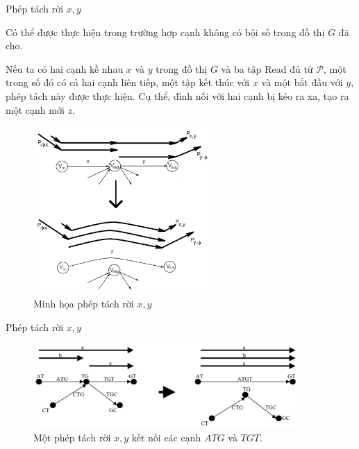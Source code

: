 \documentclass[10pt]{beamer}
\theoremstyle{remark}
\numberwithin{algocf}{section}
\numberwithin{equation}{section}
\numberwithin{dl}{section}
\numberwithin{figure}{section}
\begin{document}
\begin{frame}{Phép tách rời $x, y$}

    Có thể được thực hiện trong trường hợp cạnh không có bội số trong đồ thị $G$ đã cho.
    
    Nếu ta có hai cạnh kề nhau $x$ và $y$ trong đồ thị $G$ và ba tập Read đủ từ $\mathcal{P}$, một trong số đó có cả hai cạnh liên tiếp, một tập kết thúc với $x$ và một bắt đầu với $y$, phép tách này được thực hiện. Cụ thể, đỉnh nối với hai cạnh bị kéo ra xa, tạo ra một cạnh mới $z$.

    \begin{figure}[h!]
        \centering
        \includegraphics[width=0.6\textwidth]{figures/xy_detachment.png}
        \caption{Minh họa phép tách rời $x, y$ \cite{pevzner2001new}}
    \end{figure}
\end{frame}

\begin{frame}{Phép tách rời $x, y$}
    \begin{figure}[h!]
        \centering
        \includegraphics[width=0.9\textwidth]{6.png}
        \caption{Một phép tách rời $x, y$ kết nối các cạnh $ATG$ và $TGT$.}
        \label{fig:6}
    \end{figure}
\end{frame}
\end{document}
